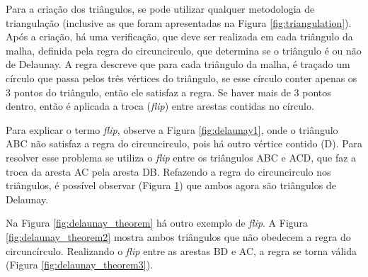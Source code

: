 \begin{figure}[H]
\begin{subfigure}[t]{0.3\textwidth}
        \caption{}
        \label{fig:delaunay2}
    \end{subfigure}
    \label{fig:delaunay}
\end{figure}

Para a criação dos triângulos, se pode utilizar qualquer metodologia de triangulação (inclusive as que foram apresentadas na Figura \ref{fig:triangulation}). Após a criação, há uma verificação, que deve ser realizada em cada triângulo da malha, definida pela regra do circuncirculo, que determina se o triângulo é ou não de Delaunay. 
A regra descreve que para cada triângulo da malha, é traçado um círculo que passa pelos três vértices do triângulo, se esse círculo conter apenas os 3 pontos do triângulo, então ele satisfaz a regra. 
Se haver mais de 3 pontos dentro, então é aplicada a troca (\textit{flip}) entre arestas contidas no círculo.

Para explicar o termo \textit{flip}, observe a Figura \ref{fig:delaunay1}, onde o triângulo ABC não satisfaz a regra do circuncirculo, pois há outro vértice contido (D).
Para resolver esse problema se utiliza o \textit{flip} entre os triângulos ABC e ACD, que faz a troca da aresta AC pela aresta DB. 
Refazendo a regra do circuncirculo nos triângulos, é possível observar (Figura \ref{fig:delaunay2}) que ambos agora são triângulos de Delaunay.

Na Figura \ref{fig:delaunay_theorem} há outro exemplo de \textit{flip}. A Figura \ref{fig:delaunay_theorem2} mostra ambos triângulos que não obedecem a regra do circuncírculo. Realizando o \textit{flip} entre as arestas BD e AC, a regra se torna válida (Figura \ref{fig:delaunay_theorem3}). 

